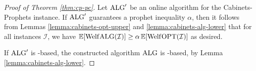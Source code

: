 \begin{proof}[Proof of Theorem \ref{thm:cp-pc}]
  Let $\mathrm{ALG}'$ be an online algorithm for the Cabinets-Prophets instance.
  If $\mathrm{ALG}'$ guarantees a prophet inequality $\alpha$, then it follows from Lemmas \ref{lemma:cabinets-opt-upper} and \ref{lemma:cabinets-alg-lower} that for all instances $\mathcal{I}$, we have $\operatorname*{\mathbb{E}}[ \mathrm{Welf}{\mathrm{ALG}}(\mathcal{I}) ] \geq \alpha \operatorname*{\mathbb{E}}[ \mathrm{Welf}{\mathrm{OPT}}(\mathcal{I}) ]$ as desired.

  If $\mathrm{ALG}'$ is \SAUP-based, the constructed algorithm $\mathrm{ALG}$ is \SAUP-based, by Lemma \ref{lemma:cabinets-alg-lower}.
\end{proof}


